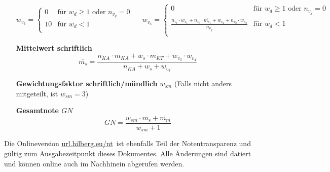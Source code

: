 \documentclass{article}
\newcommand{\onlinedoc}{\href{https://url.hilberg.eu/nt}{url.hilberg.eu/nt}}
\begin{document}
\begin{enumerate}[label=\textbf{\textbullet}, align=left, leftmargin=*]
	\[
	w_{v_3} =
	\begin{cases}
		0 & \text{für }  w_{d} \geq 1 \text{ oder } n_{v_g}=0 \\
		10 & \text{für }    w_{d} < 1 \\
	\end{cases}
	\,\,\,\,\,\,\,\,
	w_{v_4} =
	\begin{cases}
		0 & \text{für }  w_{d} \geq 1 \text{ oder } n_{v_g}=0 \\
		\frac{n_{v_1} \cdot w_{v_1} + n_{v_o} \cdot \overline{m_{s_1}} + w_{v_2} + n_{v_2} \cdot w_{v_2}}{n_{v_g}} & \text{für }    w_{d} < 1 \\
	\end{cases}
	\]	
	\item[\textbf{Mittelwert schriftlich}]
	\[
	\overline{m_{s}} = \frac{ n_{KA} \cdot \overline{m_{KA}} + w_s \cdot \overline{m_{KT}} +w_{v_3} \cdot w_{v_4}   }{n_{KA} + w_s + w_{v_3}}
	\]
	\item[\textbf{Gewichtungsfaktor schriftlich/mündlich}] $w_{sm}$ (Falls nicht anders mitgeteilt, ist $w_{sm}=3$)
	\item[\textbf{Gesamtnote $GN$}]
	\[
	GN = \frac{w_{sm} \cdot \overline{m_{s}} + \overline{m_{m}}}{w_{sm}+1}
	\]
\end{enumerate}

\renewcommand\refname{\footnotesize Mathematische Notationen}
\renewcommand{\bibname}{Quellen}

\vfill

\begingroup
\tiny


\endgroup

{\tiny Die Onlineversion \onlinedoc \, ist ebenfalls Teil der Notentransparenz und gültig zum Ausgabezeitpunkt dieses Dokumentes. Alle Änderungen sind datiert und können online auch im Nachhinein abgerufen werden.}
\end{document}
